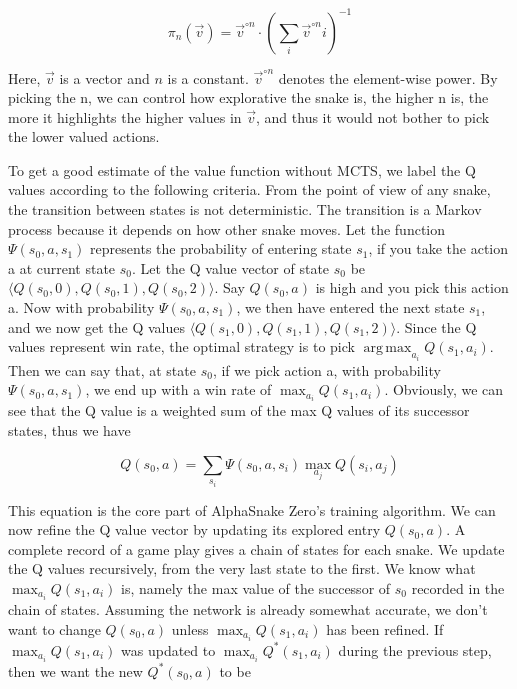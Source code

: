 \documentclass{article}
\DeclareMathOperator*{\argmax}{arg\,max}
\begin{document}
\begin{equation}
  \pi_n(\overrightarrow{v})=\overrightarrow{v}^{\circ n}\cdot(\sum\limits_i \overrightarrow{v}^{\circ n}i)^{-1}
\end{equation}

Here, $\overrightarrow{v}$ is a vector and $n$ is a constant.
$\overrightarrow{v}^{\circ n}$ denotes the element-wise power. By picking
the n, we can control how explorative the snake is, the higher n is, the
more it highlights the higher values in $\overrightarrow{v}$, and thus it
would not bother to pick the lower valued actions.

To get a good estimate of the value function without MCTS, we label the Q values
according to the following criteria. From the point of view of any snake, the
transition between states is not deterministic. The transition is a Markov
process because it depends on how other snake moves. Let the function
$\Psi(s_0,a,s_1)$ represents the probability of entering state $s_1$, if you
take the action a at current state $s_0$. Let the Q value vector of state $s_0$
be $\langle Q(s_0,0),Q(s_0,1),Q(s_0,2) \rangle$. Say $Q(s_0,a)$ is high and you
pick this action a. Now with probability $\Psi(s_0,a,s_1)$, we then have entered
the next state $s_1$, and we now get the Q values $\langle
  Q(s_1,0),Q(s_1,1),Q(s_1,2) \rangle$. Since the Q values represent win rate, the
optimal strategy is to pick $\argmax_{a_i}Q(s_1,a_i)$. Then we can say that, at
state $s_0$, if we pick action a, with probability $\Psi(s_0,a,s_1)$, we end up
with a win rate of $\max_{a_i}Q(s_1,a_i)$. Obviously, we can see that the Q
value is a weighted sum of the max Q values of its successor states, thus we
have

\begin{equation}
  Q(s_0, a) = \sum\limits_{s_i}\Psi(s_0,a,s_i)\max_{a_j} Q(s_i,a_j)
\end{equation}

This equation is the core part of AlphaSnake Zero’s training algorithm. We can
now refine the Q value vector by updating its explored entry $Q(s_0,a)$. A
complete record of a game play gives a chain of states for each snake. We update
the Q values recursively, from the very last state to the first. We know what
$\max_{a_i}Q(s_1,a_i)$ is, namely the max value of the successor of $s_0$ recorded
in the chain of states. Assuming the network is already somewhat accurate, we
don’t want to change $Q(s_0,a)$ unless $\max_{a_i}Q(s_1,a_i)$ has been refined. If
$\max_{a_i}Q(s_1,a_i)$ was updated to $\max_{a_i}Q^*(s_1,a_i)$ during the
previous step, then we want the new $Q^*(s_0,a)$ to be
\end{document}
